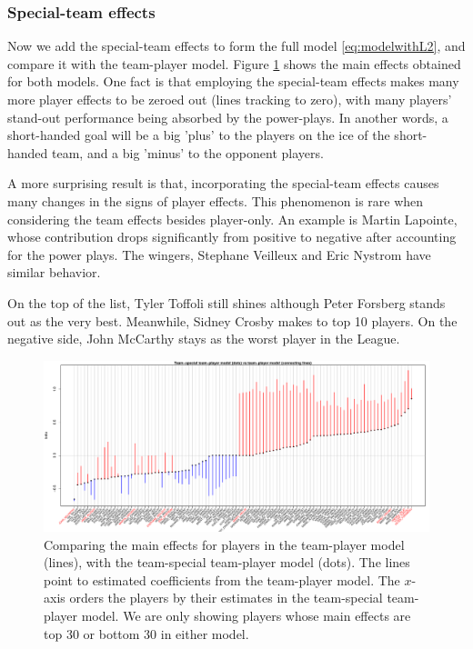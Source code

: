 \subsubsection{Special-team effects}
Now we add the special-team effects to form the full model \eqref{eq:modelwithL2}, and compare it with the team-player model. Figure \ref{fig:pts-pt.tb30} shows the main effects obtained for both models. One fact is that employing the special-team effects makes many more player effects to be zeroed out (lines tracking to zero), with many players' stand-out performance being absorbed by the power-plays. In another words, a short-handed goal will be a big 'plus' to the players on the ice of the short-handed team, and a big 'minus' to the opponent players. 

A more surprising result is that, incorporating the special-team effects causes many changes in the signs of player effects. This phenomenon is rare when considering the team effects besides player-only. An example is Martin Lapointe, whose contribution drops significantly from positive to negative after accounting for the power plays. The wingers, Stephane Veilleux and Eric Nystrom have similar behavior. 

On the top of the list, Tyler Toffoli still shines although Peter Forsberg stands out as the very best. Meanwhile, Sidney Crosby makes to top 10 players. On the negative side, John McCarthy stays as the worst player in the League.

\begin{figure}[htb!]
	\centering
	\includegraphics[width=\textwidth]{figures/ptsvspt_tb30.pdf}
	\caption{Comparing the main effects for players in the team-player model (lines), with the team-special team-player model (dots). The lines point to estimated coefficients from the team-player model. The $x$-axis orders the players by their estimates in the team-special team-player model. We are only showing players whose main effects are top 30 or bottom 30 in either model.}\label{fig:pts-pt.tb30}
\end{figure}


